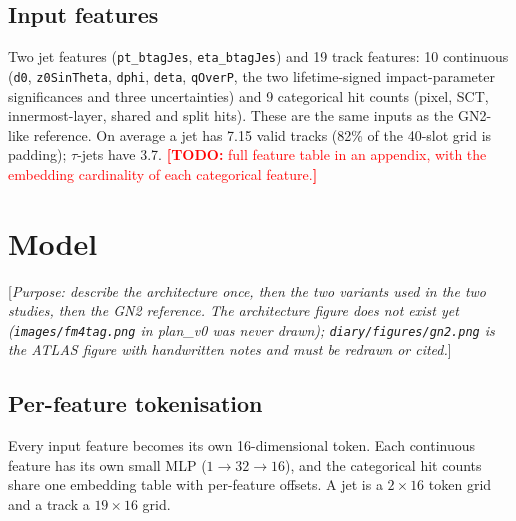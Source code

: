 \documentclass[11pt,a4paper]{article}
\newcommand{\todo}[1]{\textcolor{red}{\textbf{[TODO:} #1\textbf{]}}}
\newcommand{\note}[1]{\textcolor{blue!70!black}{[\emph{#1}]}}
\begin{document}
\subsection{Input features}
Two jet features (\texttt{pt\_btagJes}, \texttt{eta\_btagJes}) and 19 track features: 10
continuous (\texttt{d0}, \texttt{z0SinTheta}, \texttt{dphi}, \texttt{deta}, \texttt{qOverP},
the two lifetime-signed impact-parameter significances and three uncertainties) and 9
categorical hit counts (pixel, SCT, innermost-layer, shared and split hits). These are the
same inputs as the GN2-like reference. On average a jet has 7.15 valid tracks (82\% of the
40-slot grid is padding); $\tau$-jets have 3.7.
\todo{full feature table in an appendix, with the embedding cardinality of each
categorical feature.}

\section{Model}
\label{sec:model}

\note{Purpose: describe the architecture once, then the two variants used in the two
studies, then the GN2 reference. The architecture figure does not exist yet
(\texttt{images/fm4tag.png} in plan\_v0 was never drawn); \texttt{diary/figures/gn2.png}
is the ATLAS figure with handwritten notes and must be redrawn or cited.}

\subsection{Per-feature tokenisation}
Every input feature becomes its own 16-dimensional token. Each continuous feature has its
own small MLP ($1\to32\to16$), and the categorical hit counts share one embedding table
with per-feature offsets. A jet is a $2\times16$ token grid and a track a $19\times16$ grid.
\end{document}
